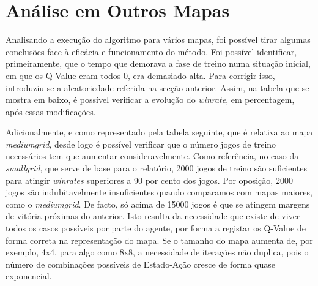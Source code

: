 \documentclass[runningheads]{article}
\begin{document}
\newpage
\section{Análise em Outros Mapas}
\label{AOM}
Analisando a execução do algoritmo para vários mapas, foi possível tirar algumas conclusões face à eficácia e funcionamento do método. Foi possível identificar, primeiramente, que o tempo que demorava a fase de treino numa situação inicial, em que os Q-Value eram todos 0, era demasiado alta. Para corrigir isso, introduziu-se a aleatoriedade referida na secção anterior. Assim, na tabela que se mostra em baixo, é possível verificar a evolução do \textit{winrate}, em percentagem, após essas modificações.
\par Adicionalmente, e como representado pela tabela seguinte, que é relativa ao mapa \textit{mediumgrid}, desde logo é possível verificar que o número jogos de treino necessários tem que aumentar consideravelmente. Como referência, no caso da \textit{smallgrid}, que serve de base para o relatório, 2000 jogos de treino são suficientes para atingir \textit{winrates} superiores a 90 por cento dos jogos. Por oposição, 2000 jogos são indubitavelmente insuficientes quando comparamos com mapas maiores, como o \textit{mediumgrid}. De facto, só acima de 15000 jogos é que se atingem margens de vitória próximas do anterior. Isto resulta da necessidade que existe de viver todos os casos possíveis por parte do agente, por forma a registar os Q-Value de forma correta na representação do mapa. Se o tamanho do mapa aumenta de, por exemplo, 4x4, para algo como 8x8, a necessidade de iterações não duplica, pois o número de combinações possíveis de Estado-Ação cresce de forma quase exponencial.
\end{document}

